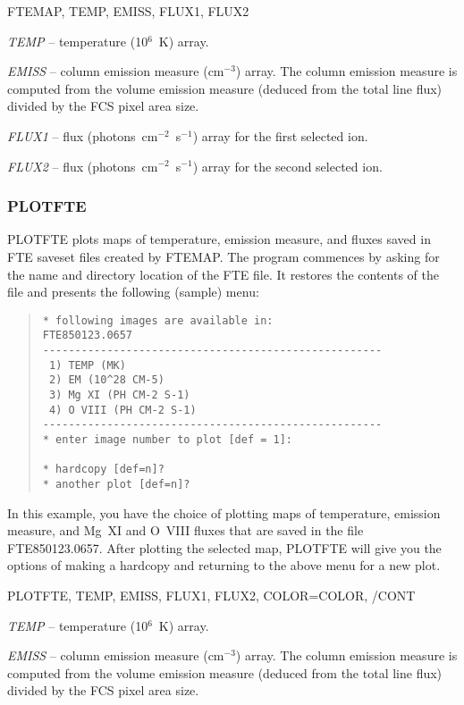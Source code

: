 {{{

FTEMAP, TEMP, EMISS, FLUX1, FLUX2


{\it TEMP} -- temperature (10$^6$~K) array.

{\it EMISS} -- column emission measure (cm$^{-3}$) array. The column emission
measure is computed from the volume emission measure (deduced from the total
line flux) divided by the FCS pixel area size.

{\it FLUX1} -- flux (photons~cm$^{-2}$~s$^{-1}$) array for the first selected
ion. 

{\it FLUX2} -- flux (photons~cm$^{-2}$~s$^{-1}$) array for the second selected
ion. 

\subsubsection{PLOTFTE}

PLOTFTE plots maps of temperature, emission measure, and fluxes saved in FTE
saveset files created by FTEMAP. The program commences by asking for the name
and directory location of the FTE file. It restores the contents of the file
and presents the following (sample) menu:
\begin{quote}
\begin{verbatim}
* following images are available in:
FTE850123.0657
-----------------------------------------------------
 1) TEMP (MK)
 2) EM (10^28 CM-5)
 3) Mg XI (PH CM-2 S-1)
 4) O VIII (PH CM-2 S-1)
-----------------------------------------------------
* enter image number to plot [def = 1]: 

* hardcopy [def=n]? 
* another plot [def=n]? 
\end{verbatim}
\end{quote}
In this example, you have the choice of plotting maps of
temperature, emission measure,  and Mg~XI and O~VIII fluxes that are saved in
the file FTE850123.0657. After plotting the selected map, PLOTFTE
will give you the options of making a hardcopy and returning to the
above menu for a new plot.


PLOTFTE, TEMP, EMISS, FLUX1, FLUX2, COLOR=COLOR, /CONT


{\it TEMP} -- temperature (10$^6$~K) array.

{\it EMISS} -- column emission measure (cm$^{-3}$) array. The column emission
measure is computed from the volume emission measure (deduced from the total
line flux) divided by the FCS pixel area size.

}}}
